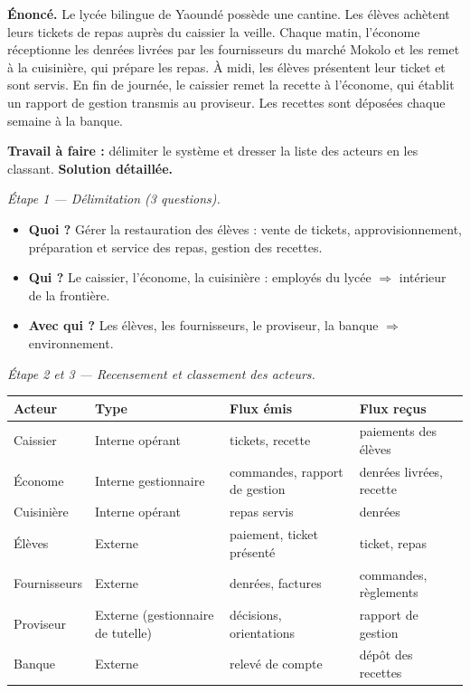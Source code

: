 \documentclass[11pt]{article}
\begin{document}
\begin{exoresolu}
\textbf{Énoncé.} Le lycée bilingue de Yaoundé possède une cantine. Les élèves achètent leurs tickets de repas auprès du caissier la veille. Chaque matin, l'économe réceptionne les denrées livrées par les fournisseurs du marché Mokolo et les remet à la cuisinière, qui prépare les repas. À midi, les élèves présentent leur ticket et sont servis. En fin de journée, le caissier remet la recette à l'économe, qui établit un rapport de gestion transmis au proviseur. Les recettes sont déposées chaque semaine à la banque.

\textbf{Travail à faire :} délimiter le système et dresser la liste des acteurs en les classant.
\tcblower
\textbf{Solution détaillée.}

\emph{Étape 1 — Délimitation (3 questions).}
\begin{itemize}
  \item \textbf{Quoi ?} Gérer la restauration des élèves : vente de tickets, approvisionnement, préparation et service des repas, gestion des recettes.
  \item \textbf{Qui ?} Le caissier, l'économe, la cuisinière : employés du lycée $\Rightarrow$ intérieur de la frontière.
  \item \textbf{Avec qui ?} Les élèves, les fournisseurs, le proviseur, la banque $\Rightarrow$ environnement.
\end{itemize}

\emph{Étape 2 et 3 — Recensement et classement des acteurs.}

\begin{center}
\begin{tabularx}{\linewidth}{|l|l|X|X|}
\hline
\rowcolor{popblueL}
\textbf{Acteur} & \textbf{Type} & \textbf{Flux émis} & \textbf{Flux reçus} \\
\hline
Caissier & Interne opérant & tickets, recette & paiements des élèves \\
\hline
Économe & Interne gestionnaire & commandes, rapport de gestion & denrées livrées, recette \\
\hline
Cuisinière & Interne opérant & repas servis & denrées \\
\hline
Élèves & Externe & paiement, ticket présenté & ticket, repas \\
\hline
Fournisseurs & Externe & denrées, factures & commandes, règlements \\
\hline
Proviseur & Externe (gestionnaire de tutelle) & décisions, orientations & rapport de gestion \\
\hline
Banque & Externe & relevé de compte & dépôt des recettes \\
\hline
\end{tabularx}
\end{center}


\end{exoresolu}
\end{document}
